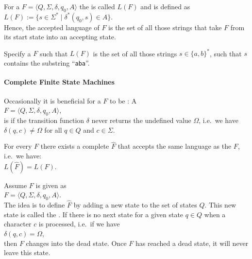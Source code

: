 \begin{Definition}
   
  For a  $F = \langle Q, \Sigma, \delta, q_0, A \rangle$ the  
  is called $L(F)$ and is defined as
  \\[0.2cm]
  \hspace*{1.3cm}
  $L(F) := \bigl\{ s \in \Sigma^* \mid \delta^*(q_0,s) \in A \bigr\}$. 
  \\[0.2cm]
  Hence, the accepted language of $F$ is the set of all those strings that take $F$ from its
  start state into an accepting state. \eox
\end{Definition}

\exerciseEng
Specify a  $F$ such that $L(F)$ is the set of all those strings $s \in \{a,b\}^*$, 
such that $s$ contains the substring  ``\texttt{aba}''.
\eox


\paragraph{Complete Finite State Machines}
Occasionally it is beneficial for a  $F$ to be : A 
\\[0.2cm]
\hspace*{1.3cm}
$F = \langle Q, \Sigma, \delta, q_0, A \rangle$,
\\[0.2cm]
is  if the transition function $\delta$ never returns the
undefined value $\Omega$, i.e.~we have 
\\[0.2cm]
\hspace*{1.3cm}
$\delta(q, c) \not= \Omega$ \quad for all $q \in Q$ and $c \in \Sigma$.

\begin{Proposition}
  For every  $F$ there exists a complete   $\widehat{F}$ that accepts
  the same language as the   $F$, i.e.~we have:
  \\[0.2cm]
  \hspace*{1.3cm}
  $L(\widehat{F}) = L(F)$.
\end{Proposition}

\proofEng
Assume $F$ is given as
\\[0.2cm]
\hspace*{1.3cm}
$F = \langle Q, \Sigma, \delta, q_0, A \rangle$.
\\[0.2cm]
The idea is to define $\widehat{F}$ by adding a new state to the set of states $Q$.  This new state is called
the  .  If there is no next state for a given state  $q \in Q$ when a character $c$
is processed, i.e.~if we have
\\[0.2cm]
\hspace*{1.3cm}
$\delta(q, c) = \Omega$,
\\[0.2cm]
then $F$ changes into the dead state.  Once $F$ has reached a dead state, it will never leave this
state.

